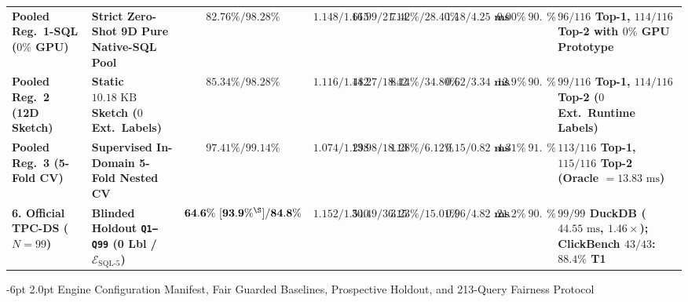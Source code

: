 \documentclass[10pt,a4paper]{article}
\makeatletter
\newenvironment{fitasttable}{%
  \begin{lrbox}{\asttblbox}%
}{%
  \end{lrbox}%
  \sbox{\asttblboxB}{%
    \ifdim\wd\asttblbox>0.96\textwidth
      \resizebox{0.96\textwidth}{!}{\usebox{\asttblbox}}%
    \else
      \usebox{\asttblbox}%
    \fi
  }%
  \ifdim\ht\asttblboxB>0.72\textheight
    \resizebox{!}{0.72\textheight}{\usebox{\asttblboxB}}%
  \else
    \usebox{\asttblboxB}%
  \fi
}
\renewcommand\subsubsection{\@startsection{subsubsection}{3}{\z@}%
  {-6pt \@plus -1.5pt \@minus -1pt}%
  {2.0pt \@plus 0.8pt}%
  {\normalfont\normalsize\bfseries}}
\makeatother
\begin{document}
\begin{table}[!htbp]
\begin{fitasttable}
\begin{tabular}{@{}llcccccccl@{}}
\textbf{Pooled Reg.\ 1-SQL ($0\%$ GPU)} & \textbf{Strict Zero-Shot 9D Pure Native-SQL Pool} & $\mathbf{82.76\% / 98.28\%}$ & $\mathbf{1.148 / 1.615}$ & $\mathbf{16.99 / 21.14}$ & $\mathbf{7.42\% / 28.40\%}$ & $\mathbf{1.18 / 4.25\text{ ms}}$ & $\mathbf{0.00\%}$ & $\mathbf{90.5\%}$ & \textbf{$96/116$ Top-1, $114/116$ Top-2 with $0\%$ GPU Prototype} \\
\textbf{Pooled Reg.\ 2 (12D Sketch)} & \textbf{Static $10.18\text{ KB}$ Sketch ($0$ Ext.\ Labels)} & $\mathbf{85.34\% / 98.28\%}$ & $\mathbf{1.116 / 1.482}$ & $\mathbf{14.27 / 18.42}$ & $\mathbf{8.14\% / 34.80\%}$ & $\mathbf{0.62 / 3.34\text{ ms}}$ & $\mathbf{12.93\%}$ & $\mathbf{90.5\%}$ & \textbf{$99/116$ Top-1, $114/116$ Top-2 ($0$ Ext.\ Runtime Labels)} \\
\textbf{Pooled Reg.\ 3 (5-Fold CV)} & \textbf{Supervised In-Domain 5-Fold Nested CV} & $\mathbf{97.41\% / 99.14\%}$ & $\mathbf{1.074 / 1.298}$ & $\mathbf{13.98 / 18.13}$ & $\mathbf{1.28\% / 6.12\%}$ & $\mathbf{0.15 / 0.82\text{ ms}}$ & $\mathbf{4.31\%}$ & $\mathbf{91.4\%}$ & \textbf{$113/116$ Top-1, $115/116$ Top-2 (Oracle $=13.83\text{ ms}$)} \\
\textbf{6. Official TPC-DS ($N=99$)} & \textbf{Blinded Holdout \texttt{Q1--Q99} (0 Lbl / $\mathcal{E}_{\text{SQL-5}}$)} & $\mathbf{64.6\%\ [93.9\%^{\S}] / 84.8\%}$ & $\mathbf{1.152 / 1.540}$ & $\mathbf{30.49 / 36.15}$ & $\mathbf{3.23\% / 15.01\%}$ & $\mathbf{0.96 / 4.82\text{ ms}}$ & $\mathbf{21.2\%}$ & $\mathbf{90.9\%}$ & \textbf{$99/99$ DuckDB ($44.55\text{ ms}$, $\mathbf{1.46\times}$); ClickBench $43/43$: $\mathbf{88.4\%}$ T1} \\
\bottomrule
\end{tabular}
\end{fitasttable}%
\end{table}

\subsubsection{Engine Configuration Manifest, Fair Guarded Baselines, Prospective Holdout, and 213-Query Fairness Protocol}
\label{sec:v852_reviewer_audit}
\end{document}
